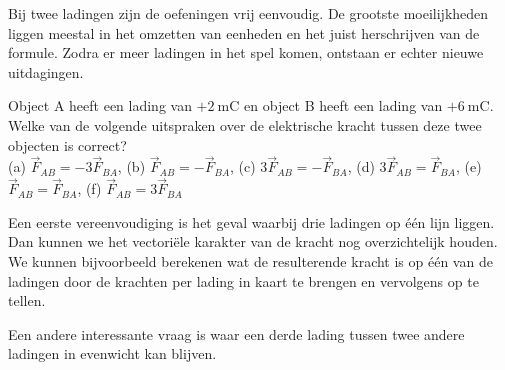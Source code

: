 Bij twee ladingen zijn de oefeningen vrij eenvoudig. De grootste moeilijkheden liggen meestal in het omzetten van eenheden en het juist herschrijven van de formule. Zodra er meer ladingen in het spel komen, ontstaan er echter nieuwe uitdagingen.

\vspace{2mm}
\begin{quiz}\label{q:actiereactie} 
	Object A heeft een lading van \(+\qty{2}{\milli\coulomb}\) en object B heeft een lading van \(+\qty{6}{\milli\coulomb}\).
Welke van de volgende uitspraken over de elektrische kracht tussen deze twee objecten is correct?\\
(a) $\vec{F}_{AB}=-3\vec{F}_{BA}$, (b) $\vec{F}_{AB}=-\vec{F}_{BA}$, (c) $3\vec{F}_{AB}=-\vec{F}_{BA}$, (d) $3\vec{F}_{AB}=\vec{F}_{BA}$, (e) $\vec{F}_{AB}=\vec{F}_{BA}$, (f) $\vec{F}_{AB}=3\vec{F}_{BA}$
\end{quiz}

Een eerste vereenvoudiging is het geval waarbij drie ladingen op één lijn liggen. Dan kunnen we het vectoriële karakter van de kracht nog overzichtelijk houden. We kunnen bijvoorbeeld berekenen wat de resulterende kracht is op één van de ladingen door de krachten per lading in kaart te brengen en vervolgens op te tellen.

Een andere interessante vraag is waar een derde lading tussen twee andere ladingen in evenwicht kan blijven.

